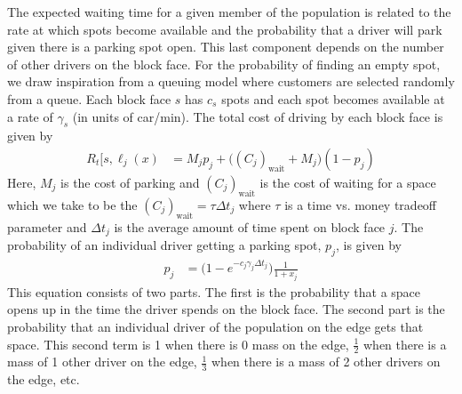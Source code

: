 



%
%
%

The expected waiting time for a given member of the population is related to the rate at which spots become available and the probability that a driver will park given there is a parking spot open.  This last component depends on the number of other drivers on the block face.  For the probability of finding an empty spot, we draw inspiration from a queuing model where customers are selected randomly from a queue.  Each block face $s$ has $c_s$ spots and each spot becomes available at a rate of $\gamma_s$ (in units of car/min).  The total cost of driving by each block face is given by
\begin{align}
R_t[s,\ell_j(x) & = M_{j} p_j + \Big((C_j)_\text{wait}+M_j \Big) (1 - p_j)
\end{align}
Here, $M_j$ is the cost of parking and $(C_j)_\text{wait}$ is the cost of waiting for a space which we take to be the $(C_j)_\text{wait} = \tau\Delta t_j$ where $\tau$ is a time vs. money tradeoff parameter and $\Delta t_j$ is the average amount of time spent on block face $j$.  The 
probability of an individual driver getting a parking spot, $p_j$, is given by
\begin{align}
p_j & = \Big(1-e^{-c_j\gamma_j \Delta t_j}\Big) \frac{1}{1+x_j} %
\end{align}
This equation consists of two parts.  The first is the probability that a space opens up in the time the driver spends on the block face.  The second part is the probability that an individual driver of the population on the edge gets that space.  This second term is 1 when there is 0 mass on the edge, $\frac{1}{2}$ when there is a mass of 1 other driver on the edge, $\frac{1}{3}$ when there is a mass of 2 other drivers on the edge, etc.  


